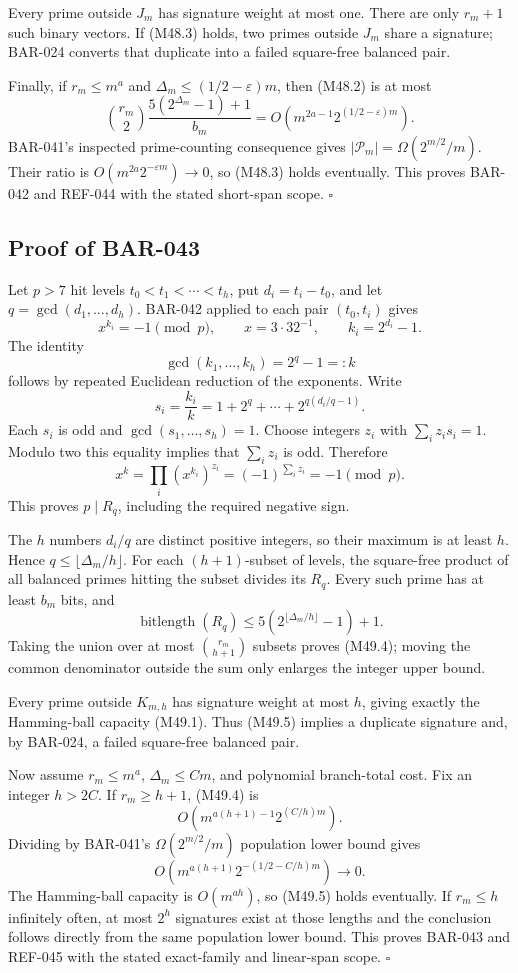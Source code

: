 \documentclass[11pt]{article}
\begin{document}
Every prime outside \(J_m\) has signature weight at most one. There are only
\(r_m+1\) such binary vectors. If (M48.3) holds, two primes outside \(J_m\)
share a signature; BAR-024 converts that duplicate into a failed
square-free balanced pair.

Finally, if \(r_m\le m^a\) and
\(\Delta_m\le(1/2-\varepsilon)m\), then (M48.2) is at most
\[
\binom{r_m}{2}
\frac{5(2^{\Delta_m}-1)+1}{b_m}
=O\!\left(m^{2a-1}2^{(1/2-\varepsilon)m}\right).
\]
BAR-041's inspected prime-counting consequence gives
\(|\mathcal P_m|=\Omega(2^{m/2}/m)\). Their ratio is
\(O(m^{2a}2^{-\varepsilon m})\to0\), so (M48.3) holds eventually. This
proves BAR-042 and REF-044 with the stated short-span scope. \(\square\)

\subsection{Proof of BAR-043}
\label{proof:BAR-043}

Let \(p>7\) hit levels \(t_0<t_1<\cdots<t_h\), put
\(d_i=t_i-t_0\), and let \(q=\gcd(d_1,\ldots,d_h)\). BAR-042 applied to
each pair \((t_0,t_i)\) gives
\[
x^{k_i}=-1\pmod p,
\qquad
x=3\cdot32^{-1},
\qquad
k_i=2^{d_i}-1.
\]
The identity
\[
\gcd(k_1,\ldots,k_h)=2^q-1=:k
\]
follows by repeated Euclidean reduction of the exponents. Write
\[
s_i=\frac{k_i}{k}
=1+2^q+\cdots+2^{q(d_i/q-1)}.
\]
Each \(s_i\) is odd and \(\gcd(s_1,\ldots,s_h)=1\). Choose integers
\(z_i\) with \(\sum_i z_i s_i=1\). Modulo two this equality implies that
\(\sum_i z_i\) is odd. Therefore
\[
x^k
=\prod_i(x^{k_i})^{z_i}
=(-1)^{\sum_i z_i}
=-1\pmod p.
\]
This proves \(p\mid R_q\), including the required negative sign.

The \(h\) numbers \(d_i/q\) are distinct positive integers, so their maximum
is at least \(h\). Hence \(q\le\lfloor\Delta_m/h\rfloor\).
For each \((h+1)\)-subset of levels, the square-free product of all balanced
primes hitting the subset divides its \(R_q\). Every such prime has at least
\(b_m\) bits, and
\[
\operatorname{bitlength}(R_q)
\le5(2^{\lfloor\Delta_m/h\rfloor}-1)+1.
\]
Taking the union over at most \(\binom{r_m}{h+1}\) subsets proves (M49.4);
moving the common denominator outside the sum only enlarges the integer
upper bound.

Every prime outside \(K_{m,h}\) has signature weight at most \(h\), giving
exactly the Hamming-ball capacity (M49.1). Thus (M49.5) implies a duplicate
signature and, by BAR-024, a failed square-free balanced pair.

Now assume \(r_m\le m^a\), \(\Delta_m\le Cm\), and polynomial branch-total
cost. Fix an integer \(h>2C\). If \(r_m\ge h+1\), (M49.4) is
\[
O\!\left(m^{a(h+1)-1}2^{(C/h)m}\right).
\]
Dividing by BAR-041's
\(\Omega(2^{m/2}/m)\) population lower bound gives
\[
O\!\left(
m^{a(h+1)}2^{-(1/2-C/h)m}
\right)\longrightarrow0.
\]
The Hamming-ball capacity is \(O(m^{ah})\), so (M49.5) holds eventually.
If \(r_m\le h\) infinitely often, at most \(2^h\) signatures exist at those
lengths and the conclusion follows directly from the same population lower
bound. This proves BAR-043 and REF-045 with the stated exact-family and
linear-span scope. \(\square\)
\end{document}
